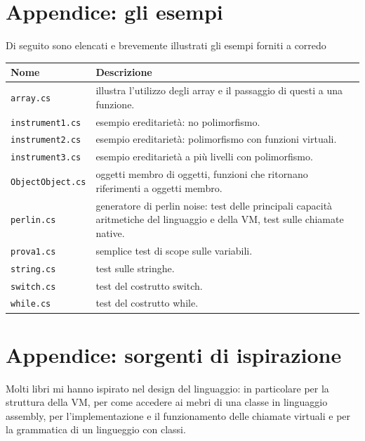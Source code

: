 \documentclass[a4paper, 11pt]{article}
\newcommand{\code}[1]{\scriptsize{\texttt{#1}}\normalsize}
\begin{document}
\appendix
\section{Appendice: gli esempi}

Di seguito sono elencati e brevemente illustrati gli esempi forniti a corredo

\begin{center}
\begin{tabular}{l|p{5.5 cm}}
\hline
\textbf{Nome} & \textbf{Descrizione}\\
\hline
\code{array.cs} & illustra l'utilizzo degli array e il passaggio di questi a una funzione.\\
\code{instrument1.cs} & esempio ereditariet\`a: no polimorfismo.\\
\code{instrument2.cs} & esempio ereditariet\`a: polimorfismo con funzioni virtuali.\\
\code{instrument3.cs} & esempio ereditariet\`a a pi\`u livelli con polimorfismo.\\
\code{ObjectObject.cs} & oggetti membro di oggetti, funzioni che ritornano riferimenti a oggetti membro.\\
\code{perlin.cs} & generatore di perlin noise: test delle principali capacit\`a aritmetiche del linguaggio e della VM, test sulle chiamate native.\\
\code{prova1.cs} & semplice test di scope sulle variabili.\\
\code{string.cs} & test sulle stringhe.\\
\code{switch.cs} & test del costrutto switch.\\
\code{while.cs} & test del costrutto while.\\
\hline
\end{tabular}
\end{center}

\section{Appendice: sorgenti di ispirazione}

Molti libri mi hanno ispirato nel design del linguaggio: in particolare \cite{GS03} per la struttura della VM, \cite{Rob00} per come accedere ai mebri di una classe in linguaggio assembly, \cite{Bruce02} per l'implementazione e il funzionamento delle chiamate virtuali e \cite{Bjarne} per la grammatica di un lingueggio con classi.




\end{document}
